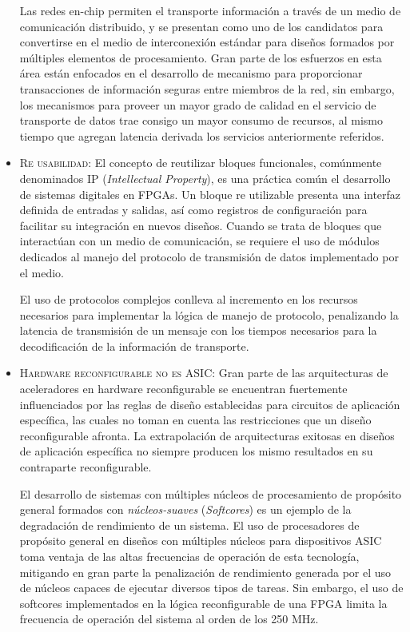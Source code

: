 \begin{itemize}
			Las redes en-chip permiten el transporte información a través de un medio de comunicación distribuido, y se presentan como uno de los candidatos para convertirse en el medio de interconexión estándar para diseños formados por múltiples elementos de procesamiento. Gran parte de los esfuerzos en esta área están enfocados en el desarrollo de mecanismo para proporcionar transacciones de información seguras entre miembros de la red, sin embargo, los mecanismos para proveer un mayor grado de calidad en el servicio de transporte de datos trae consigo un mayor consumo de recursos, al mismo tiempo que agregan latencia derivada los servicios anteriormente referidos.

			\item 	\textsc{Re usabilidad:} El concepto de reutilizar bloques funcionales, comúnmente denominados IP (\textit{Intellectual Property}), es una práctica común el desarrollo de sistemas digitales en FPGAs. Un bloque re utilizable presenta una interfaz  definida de entradas y salidas, así como registros de configuración para facilitar su integración en nuevos diseños. Cuando se trata de bloques que interactúan con un medio de comunicación, se requiere el uso de módulos dedicados al manejo del protocolo de transmisión de datos implementado por el medio.

			El uso de protocolos complejos conlleva al incremento en los recursos necesarios para implementar la lógica de manejo de protocolo, penalizando la latencia de transmisión de un mensaje con los tiempos necesarios para la decodificación de la información de transporte.

			\item \textsc{Hardware reconfigurable no es ASIC:} Gran parte de las arquitecturas de aceleradores en hardware reconfigurable se encuentran fuertemente influenciados por las reglas de diseño establecidas para circuitos de aplicación específica, las cuales no toman en cuenta las restricciones que un diseño reconfigurable afronta. La extrapolación de arquitecturas exitosas en diseños de aplicación específica no siempre producen los mismo resultados en su contraparte reconfigurable.

			El desarrollo de sistemas con múltiples núcleos de procesamiento de propósito general formados con \textit{núcleos-suaves}\cite{chapter0:Microblaze:Xilinx, chapter0:NiosII:Altera} (\textit{Softcores}) es un ejemplo de la degradación de rendimiento de un sistema. El uso de procesadores de propósito general en diseños con múltiples núcleos para dispositivos ASIC toma ventaja de las altas frecuencias de operación de esta tecnología, mitigando en gran parte la penalización de rendimiento generada por el uso de núcleos capaces de ejecutar diversos tipos de tareas. Sin embargo, el uso de softcores implementados en la lógica reconfigurable de una FPGA limita la frecuencia de operación del sistema al orden de los 250 MHz. 
			

\end{itemize}
